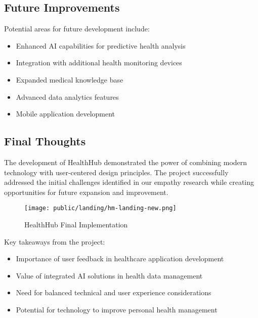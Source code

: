 \subsection{Future Improvements}

Potential areas for future development include:

\begin{itemize}
    \item Enhanced AI capabilities for predictive health analysis
    \item Integration with additional health monitoring devices
    \item Expanded medical knowledge base
    \item Advanced data analytics features
    \item Mobile application development
\end{itemize}

\subsection{Final Thoughts}
The development of HealthHub demonstrated the power of combining modern technology with user-centered design principles. The project successfully addressed the initial challenges identified in our empathy research while creating opportunities for future expansion and improvement.

\begin{figure}[H]
    \centering
    \texttt{[image: public/landing/hm-landing-new.png]}
    \caption{HealthHub Final Implementation}
\end{figure}

Key takeaways from the project:
\begin{itemize}
    \item Importance of user feedback in healthcare application development
    \item Value of integrated AI solutions in health data management
    \item Need for balanced technical and user experience considerations
    \item Potential for technology to improve personal health management
\end{itemize}

